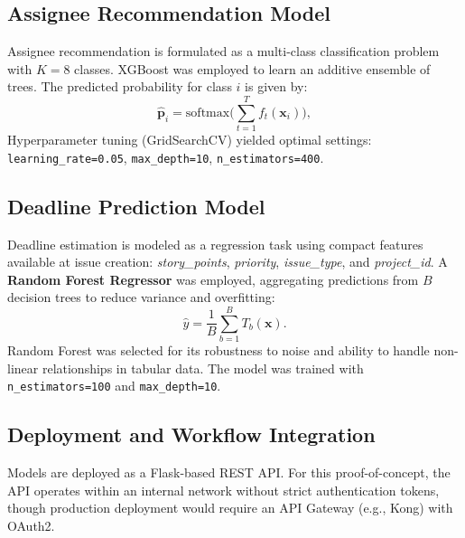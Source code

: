 \documentclass[conference]{IEEEtran}
\begin{document}
\subsection{Assignee Recommendation Model}

Assignee recommendation is formulated as a multi-class classification problem with $K=8$ classes. XGBoost was employed to learn an additive ensemble of trees. The predicted probability for class $i$ is given by:
\begin{equation}
\hat{\mathbf{p}}_i = \mathrm{softmax}\Big(\sum_{t=1}^{T} f_t(\mathbf{x}_i)\Big),
\label{eq:xgb_pred}
\end{equation}
Hyperparameter tuning (GridSearchCV) yielded optimal settings: \texttt{learning\_rate=0.05}, \texttt{max\_depth=10}, \texttt{n\_estimators=400}.

\subsection{Deadline Prediction Model}

Deadline estimation is modeled as a regression task using compact features available at issue creation: \textit{story\_points}, \textit{priority}, \textit{issue\_type}, and \textit{project\_id}. A \textbf{Random Forest Regressor} was employed, aggregating predictions from $B$ decision trees to reduce variance and overfitting:
\begin{equation}
\hat{y} = \frac{1}{B} \sum_{b=1}^{B} T_b(\mathbf{x}).
\end{equation}
Random Forest was selected for its robustness to noise and ability to handle non-linear relationships in tabular data. The model was trained with \texttt{n\_estimators=100} and \texttt{max\_depth=10}.

\subsection{Deployment and Workflow Integration}

Models are deployed as a Flask-based REST API. For this proof-of-concept, the API operates within an internal network without strict authentication tokens, though production deployment would require an API Gateway (e.g., Kong) with OAuth2.
\end{document}

